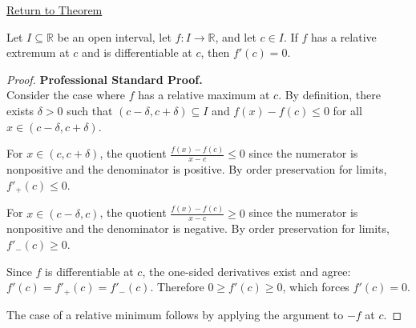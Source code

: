 \newpage
{}
\label{prf:interior-extremum-theorem}

\begin{remark*}[Return]
\hyperref[thm:interior-extremum-theorem]{Return to Theorem}
\end{remark*}

\begin{theorem*}
Let $I \subseteq \mathbb{R}$ be an open interval, let $f : I \to \mathbb{R}$, and let $c \in I$. If $f$ has a relative extremum at $c$ and is differentiable at $c$, then $f'(c) = 0$.
\end{theorem*}

\begin{proof}
\textbf{Professional Standard Proof.}~\\
Consider the case where $f$ has a relative maximum at $c$. By definition, there exists $\delta > 0$ such that $(c - \delta, c + \delta) \subseteq I$ and $f(x) - f(c) \leq 0$ for all $x \in (c - \delta, c + \delta)$.

For $x \in (c, c + \delta)$, the quotient $\frac{f(x) - f(c)}{x - c} \leq 0$ since the numerator is nonpositive and the denominator is positive. By order preservation for limits, $f'_+(c) \leq 0$.

For $x \in (c - \delta, c)$, the quotient $\frac{f(x) - f(c)}{x - c} \geq 0$ since the numerator is nonpositive and the denominator is negative. By order preservation for limits, $f'_-(c) \geq 0$.

Since $f$ is differentiable at $c$, the one-sided derivatives exist and agree: $f'(c) = f'_+(c) = f'_-(c)$. Therefore $0 \geq f'(c) \geq 0$, which forces $f'(c) = 0$.

The case of a relative minimum follows by applying the argument to $-f$ at $c$.
\end{proof}


